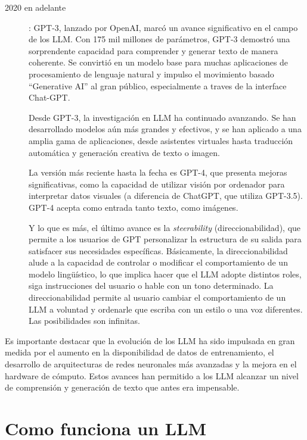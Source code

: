 \begin{description}
\item[2020 en adelante]: GPT-3, lanzado por OpenAI, marcó un avance significativo en el campo de los LLM. Con 175 mil millones de parámetros, GPT-3 demostró una sorprendente capacidad para comprender y generar texto de manera coherente. Se convirtió en un modelo base para muchas aplicaciones de procesamiento de lenguaje natural y impulso el movimiento basado ``Generative AI'' al gran público, especialmente a traves de la interface Chat-GPT.

Desde GPT-3, la investigación en LLM ha continuado avanzando. Se han desarrollado modelos aún más grandes y efectivos, y se han aplicado a una amplia gama de aplicaciones, desde asistentes virtuales hasta traducción automática y generación creativa de texto o imagen.

La versión más reciente hasta la fecha es GPT-4, que presenta mejoras significativas, como la capacidad de utilizar visión por ordenador para interpretar datos visuales (a diferencia de ChatGPT, que utiliza GPT-3.5). GPT-4 acepta como entrada tanto texto, como imágenes. 

Y lo que es más, el último avance es la \textit{steerability} (direccionabilidad), que permite a los usuarios de GPT personalizar la estructura de su salida para satisfacer sus necesidades específicas. Básicamente, la direccionabilidad alude a la capacidad de controlar o modificar el comportamiento de un modelo lingüístico, lo que implica hacer que el LLM adopte distintos roles, siga instrucciones del usuario o hable con un tono determinado. La direccionabilidad permite al usuario cambiar el comportamiento de un LLM a voluntad y ordenarle que escriba con un estilo o una voz diferentes. Las posibilidades son infinitas.

\end{description}


Es importante destacar que la evolución de los LLM ha sido impulsada en gran medida por el aumento en la disponibilidad de datos de entrenamiento, el desarrollo de arquitecturas de redes neuronales más avanzadas y la mejora en el hardware de cómputo. Estos avances han permitido a los LLM alcanzar un nivel de comprensión y generación de texto que antes era impensable.

\section{Como funciona un LLM}



